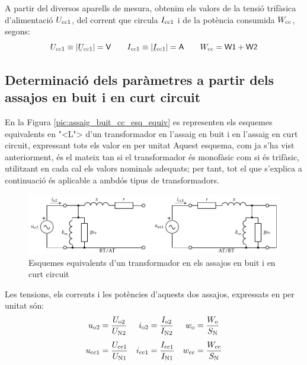 A partir del diversos aparells de mesura, obtenim els valors de la
tensi\'{o} trif\`{a}sica d'alimentaci\'{o} $U_\mathrm{cc1}$, del corrent que circula
$I_\mathrm{cc1}$ i de la pot\`{e}ncia consumida $W_\mathrm{cc}$, segons:
\begin{equation}
    U\ped{cc1}\equiv|\cmplx{U}\ped{cc1}|=\textsf{V} \qquad
    I\ped{cc1}\equiv|\cmplx{I}\ped{cc1}|=\textsf{A} \qquad
    W\ped{cc}=\textsf{W1}+\textsf{W2}
\end{equation}

\subsection{Determinaci\'{o} dels par\`{a}metres a partir dels assajos en buit i en curt circuit}

En la Figura \vref{pic:assaig_buit_cc_esq_equiv}  es representen els
esquemes equivalents en {"<}L{">} d'un transformador en l'assaig en buit i
en l'assaig en curt circuit, expressant tots els valor en per unitat
Aquest esquema, com ja s'ha vist anteriorment, \'{e}s el mateix tan si
el transformador \'{e}s monof\`{a}sic com si \'{e}s trif\`{a}sic, utilitzant en cada
cal els valors nominals adequats; per tant, tot el que s'explica  a
continuaci\'{o} \'{e}s aplicable a ambd\'{o}s tipus de transformadors.

\begin{figure}[htb]
\centering
    \includegraphics{Imatges/Cap-TrafosPot-Assaig-Buit-CC-Esq-Equiv.pdf}
\caption{Esquemes equivalents d'un transformador en els assajos en
buit i en curt circuit} \label{pic:assaig_buit_cc_esq_equiv}
\end{figure}

Les tensions, els corrents i les pot\`{e}ncies d'aquests dos  assajos,
expressats en per unitat s\'{o}n:
\begin{align}
    u_\mathrm{o2} &=\frac{U_\mathrm{o2}}{U_\mathrm{N2}} &
    i_\mathrm{o2} &=\frac{I_\mathrm{o2}}{I_\mathrm{N2}} &
    w_\mathrm{o}  &=\frac{W_\mathrm{o}}{S_\mathrm{N}} \\[1ex]
    u_\mathrm{cc1} &=\frac{U_\mathrm{cc1}}{U_\mathrm{N1}} &
    i_\mathrm{cc1} &=\frac{I_\mathrm{cc1}}{I_\mathrm{N1}} &
    w_\mathrm{cc} &=\frac{W_\mathrm{cc}}{S_\mathrm{N}}
\end{align}

